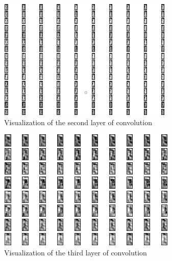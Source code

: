 \documentclass[12pt]{article}
\theoremstyle{definition}
\begin{document}
	\begin{figure}
		\includegraphics[width=\textwidth]{conv-see/visualization-4.jpg}
		\caption{Visualization of the second layer of convolution}
		\label{figure:visualize-conv-2}
	\end{figure}

	\begin{figure}
		\includegraphics[width=\textwidth]{conv-see/visualization-8.jpg}
		\caption{Visualization of the third layer of convolution}
		\label{figure:visualize-conv-3}
	\end{figure}
\end{document}
